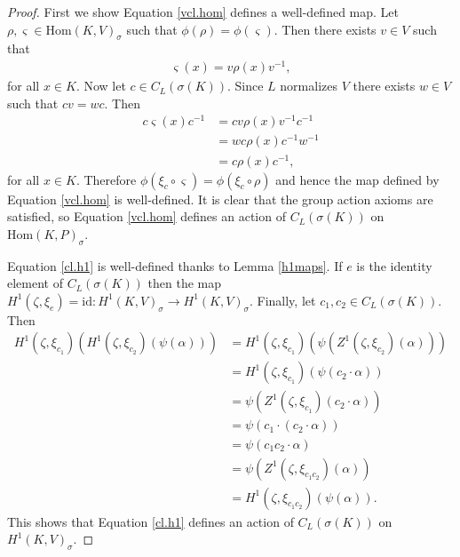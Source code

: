 \begin{proof}
	First we show Equation \ref{vcl.hom} defines a well-defined map. Let $\rho, \varsigma \in \mathrm{Hom}(K, V)_\sigma$ such that $\phi(\rho) = \phi(\varsigma)$. Then there exists $v \in V$ such that
	\begin{align*} \varsigma(x) = v\rho(x)v^{-1}, \end{align*}
		for all $x \in K$. Now let $c \in C_L(\sigma(K))$. Since $L$ normalizes $V$ there exists $w \in V$ such that $cv = wc$. Then
		\begin{align*}
			c \varsigma(x)c^{-1}
			&= cv \rho(x) v^{-1}c^{-1} \\
			&= wc \rho(x) c^{-1}w^{-1} \\
			&= c \rho(x) c^{-1},
		\end{align*}
		for all $x \in K$. Therefore $\phi(\xi_c \circ \varsigma) = \phi(\xi_c \circ \rho)$ and hence the map defined by Equation \ref{vcl.hom} is well-defined. It is clear that the group action axioms are satisfied, so Equation \ref{vcl.hom} defines an action of $C_L(\sigma(K))$ on $\mathrm{Hom}(K, P)_\sigma$.

		Equation \ref{cl.h1} is well-defined thanks to Lemma \ref{h1maps}. If $e$ is the identity element of $C_L(\sigma(K))$ then the map $H^1(\zeta, \xi_e) = \mathrm{id}:H^1(K, V)_\sigma \rightarrow H^1(K, V)_\sigma$. Finally, let $c_1, c_2 \in C_L(\sigma(K))$. Then
		\begin{align*}
			H^1(\zeta, \xi_{c_1})\left(H^1(\zeta, \xi_{c_2})(\psi(\alpha))\right)
			&= H^1(\zeta, \xi_{c_1})\left(\psi(Z^1(\zeta, \xi_{c_2})(\alpha))\right) \\
			&= H^1(\zeta, \xi_{c_1})\left(\psi(c_2 \cdot \alpha)\right) \\
			&= \psi\left( Z^1(\zeta, \xi_{c_1})(c_2 \cdot \alpha)\right) \\
			&= \psi\left( c_1 \cdot (c_2 \cdot \alpha)\right) \\
			&= \psi\left( c_1c_2 \cdot \alpha\right) \\
			&= \psi\left( Z^1(\zeta, \xi_{c_1c_2})(\alpha)\right) \\
			&= H^1(\zeta, \xi_{c_1c_2})\left(\psi(\alpha)\right).
		\end{align*}
		This shows that Equation \ref{cl.h1} defines an action of $C_L(\sigma(K))$ on $H^1(K, V)_\sigma$.


\end{proof}
